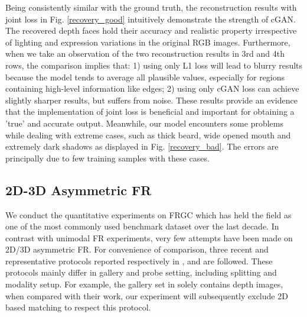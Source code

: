 \documentclass{bmvc2k}
\begin{document}
Being consistently similar with the ground truth, the reconstruction results with joint loss in Fig. \ref{recovery_good} intuitively demonstrate the strength of cGAN. The recovered depth faces hold their accuracy and realistic property irrespective of lighting and expression variations in the original RGB images. Furthermore, when we take an observation of the two reconstruction results in 3rd and 4th rows, the comparison implies that: 1) using only L1 loss will lead to blurry results because the model tends to average all plausible values, especially for regions containing high-level information like edges; 2) using only cGAN loss can achieve slightly sharper results, but suffers from noise. These results provide an evidence that the implementation of joint loss is beneficial and important for obtaining a 'true' and accurate output. Meanwhile, our model encounters some problems while dealing with extreme cases, such as thick beard, wide opened mouth and extremely dark shadows as displayed in Fig. \ref{recovery_bad}. The errors are principally due to few training samples with these cases.

\subsection{2D-3D Asymmetric FR}

We conduct the quantitative experiments on FRGC which has held the field as one of the most commonly used benchmark dataset over the last decade. In contrast with unimodal FR experiments, very few attempts have been made on 2D/3D asymmetric FR. For convenience of comparison, three recent and representative protocols reported respectively in \cite{jin2014cross}, \cite{huang2012oriented} and \cite{wang20142d} are followed. These protocols mainly differ in gallery and probe setting, including splitting and modality setup. For example, the gallery set in \cite{wang20142d} solely contains depth images, when compared with their work, our experiment will subsequently exclude 2D based matching to respect this protocol.

\end{document}
